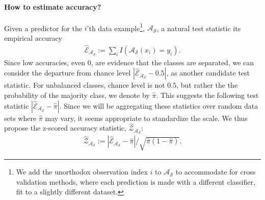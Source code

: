 \documentclass[12pt,a4paper]{article}
\theoremstyle{definition}
\newcommand{\accEstim}{\hat{\mathcal{E}}}
\newcommand{\accZ}{\hat{\mathcal{Z}}}
\newcommand{\hyp}{\algo_\data} %
\newcommand{\majority}{\hat{\pi}}
\newcommand{\algo}{\mathcal{A}}
\newcommand{\data}{\mathcal{S}}
\begin{document}
\paragraph{How to estimate accuracy?}
\label{sec:estimate_accuracy}
Given a predictor for the $i$'th data example\footnote{We add the unorthodox observation index $i$ to $\hyp$ to accommodate for cross validation methods, where each prediction is made with a different classifier, fit to a slightly different dataset.}, $\hyp$, a natural test statistic its empirical accuracy 
\begin{align}
\label{eq:accuracy_estim}
	\accEstim_{\hyp}:= \sum_i I(\hyp(x_i)=y_i).
\end{align}
Since low accuracies, even $0$, are evidence that the classes are separated, we can consider the departure from chance level $|\accEstim_{\hyp}-0.5|$, as another candidate test statistic.
For unbalanced classes, chance level is not $0.5$, but rather the the probability of the majority class, we denote by $\majority$.
This suggests the following test statistic $|\accEstim_{\hyp}-\majority|$.
Since we will be aggregating these statistics over random data sets where $\majority$ may vary, it seems appropriate to standardize the scale. 
We thus propose the z-scored accuracy statistic, $\accZ_{\hyp}$:
\begin{align}
\label{eq:z_scored_accuracy}
	\accZ_{\hyp} := |\accEstim_{\hyp}-\majority|/\sqrt{\majority(1-\majority)}.
\end{align} 
\end{document}
